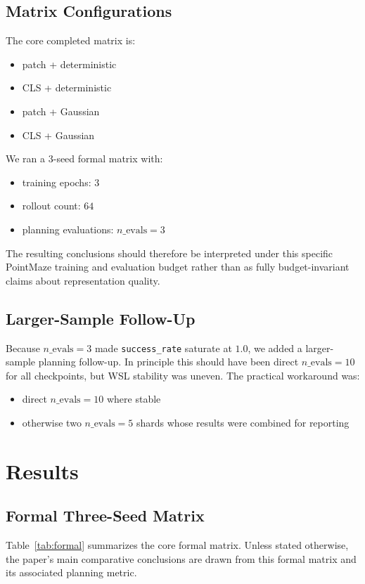 \documentclass[11pt]{article}
\begin{document}
\subsection{Matrix Configurations}
The core completed matrix is:
\begin{itemize}
\item patch + deterministic
\item CLS + deterministic
\item patch + Gaussian
\item CLS + Gaussian
\end{itemize}

We ran a \(3\)-seed formal matrix with:
\begin{itemize}
\item training epochs: \(3\)
\item rollout count: \(64\)
\item planning evaluations: \(n\_\text{evals}=3\)
\end{itemize}

The resulting conclusions should therefore be interpreted under this specific PointMaze training and evaluation budget rather than as fully budget-invariant claims about representation quality.

\subsection{Larger-Sample Follow-Up}
Because \(n\_\text{evals}=3\) made \texttt{success\_rate} saturate at \(1.0\), we added a larger-sample planning follow-up. In principle this should have been direct \(n\_\text{evals}=10\) for all checkpoints, but WSL stability was uneven. The practical workaround was:
\begin{itemize}
\item direct \(n\_\text{evals}=10\) where stable
\item otherwise two \(n\_\text{evals}=5\) shards whose results were combined for reporting
\end{itemize}

\section{Results}
\subsection{Formal Three-Seed Matrix}
Table~\ref{tab:formal} summarizes the core formal matrix.
Unless stated otherwise, the paper's main comparative conclusions are drawn from this formal matrix and its associated planning metric.
\end{document}
